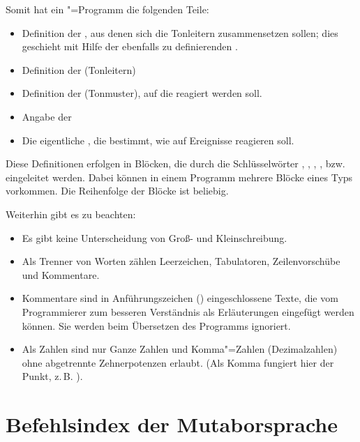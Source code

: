 Somit hat ein \mutabor{}"=Programm die folgenden Teile:

\begin{itemize}
\item Definition der , aus denen sich die
  Tonleitern zusammensetzen sollen; dies geschieht mit Hilfe der
  ebenfalls zu definierenden .
\item Definition der 
  (Tonleitern)
\item Definition der  (Tonmuster),
  auf die reagiert werden soll.
\item Angabe der 
\item Die eigentliche , die
  bestimmt, wie \mutabor{} auf Ereignisse reagieren soll.
\end{itemize}


Diese Definitionen erfolgen in Blöcken, die durch die Schlüsselwörter
, , ,
,  bzw.  
eingeleitet werden. Dabei können in einem Programm mehrere Blöcke
eines Typs vorkommen. Die Reihenfolge der Blöcke ist beliebig.

Weiterhin gibt es zu beachten:

\begin{itemize}
\item Es gibt keine Unterscheidung von Groß- und Kleinschreibung.
\item Als Trenner von Worten zählen Leerzeichen, Tabulatoren,
  Zeilenvorschübe und Kommentare.
\item Kommentare sind in Anführungszeichen (\dq)
  eingeschlossene Texte, die vom Programmierer zum besseren
  Verständnis als Erläuterungen eingefügt werden können. Sie werden
  beim Übersetzen des Programms ignoriert.
\item Als Zahlen sind nur Ganze Zahlen und Komma"=Zahlen
  (Dezimalzahlen) ohne abgetrennte Zehnerpotenzen erlaubt. (Als Komma
  fungiert hier der Punkt, z.\,B. ).
\end{itemize}



\chapter{Befehlsindex der Mutaborsprache}\label{sec:SX_COMMANDS}

